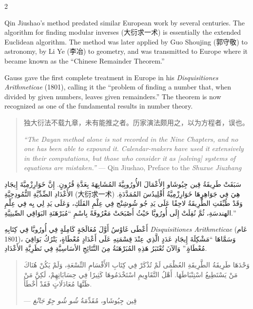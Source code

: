 \documentclass[11pt,a4paper]{article}
\newcommand{\ar}[1]{\arabicfont\beginR #1\endR}
\newcommand{\zhtext}[1]{{\chinese #1}}
\newenvironment{bilingual}{%
  \begin{paracol}{2}
}{%
  \end{paracol}
}
\begin{document}
\begin{bilingual}

\begin{leftcolumn*}
Qin Jiushao's method predated similar European work by several centuries. The algorithm for finding modular inverses (\zhtext{大衍求一术}) is essentially the extended Euclidean algorithm. The method was later applied by Guo Shoujing (\zhtext{郭守敬}) to astronomy, by Li Ye (\zhtext{李冶}) to geometry, and was transmitted to Europe where it became known as the ``Chinese Remainder Theorem.''

Gauss gave the first complete treatment in Europe in his \textit{Disquisitiones Arithmeticae} (1801), calling it the ``problem of finding a number that, when divided by given numbers, leaves given remainders.'' The theorem is now recognized as one of the fundamental results in number theory.

\begin{quote}
\zhtext{独大衍法不载九章，未有能推之者。历家演法颇用之，以为方程者，误也。}

\textit{``The Dayan method alone is not recorded in the Nine Chapters, and no one has been able to expound it. Calendar-makers have used it extensively in their computations, but those who consider it as [solving] systems of equations are mistaken.''} --- Qin Jiushao, Preface to the \textit{Shuxue Jiuzhang}
\end{quote}
\end{leftcolumn*}

\begin{rightcolumn*}
\ar{سَبَقَتْ طَرِيقَةُ قِين جِيُوشَاو الأَعْمَالَ الأُورُوبِيَّةَ المُشَابِهَةَ بِعَدَّةِ قُرُونٍ. إِنَّ خَوَارِزْمِيَّةَ إِيجَادِ الأَعْدَادِ الضِّدِّيَّةِ النُّمُودِجِيَّةِ (大衍求一术) هِيَ فِي جَوَاهِرِهَا خَوَارِزْمِيَّةُ أُقْلِيدُسَ المُمَدَّدَةِ. وَقَدْ طُبِّقَتِ الطَّرِيقَةُ لاحِقًا عَلَى يَدِ جُو شُوشِنْج فِي عِلْمِ الفَلَكِ، وَعَلَى يَدِ لِي يِه فِي عِلْمِ الهندسَةِ، ثُمَّ نُقِلَتْ إِلَى أُورُوبَّا حَيْثُ أَصْبَحَتْ مَعْرُوفَةً بِاسْمِ \enquote{مُبَرْهَنَةِ البَوَاقِي الصِّينِيَّةِ.}}

\ar{أَعْطَى غَاوْسُ أَوَّلَ مُعَالَجَةٍ كَامِلَةٍ فِي أُورُوبَّا فِي كِتَابِهِ \textit{Disquisitiones Arithmeticae} (عَام 1801)، وَسَمَّاهَا \enquote{مَشْكِلَةَ إِيجَادِ عَدَدٍ الَّذِي عِنْدَ قِسْمَتِهِ عَلَى أَعْدَادٍ مُعْطَاةٍ، يَتْرُكُ بَوَاقِيَ مُعْطَاةٍ.} وَالآنَ تُعْتَبَرُ هَذِهِ المُبَرْهَنَةُ مِنَ النَّتَائِجِ الأسَاسِيَّةِ فِي نَظَرِيَّةِ الأَعْدَادِ.}

\begin{quote}
\ar{وَحْدَهَا طَرِيقَةُ الطَّرِيقَةِ العُظْمَى لَمْ تُذْكَرْ فِي كِتَابِ الأَقْسَامِ التِّسْعَةِ، وَلَمْ يَكُنْ هُنَاكَ مَنْ يَسْتَطِيعُ اسْتِنْبَاطَهَا. أَهْلُ التَّقَاوِيمِ اسْتَخْدَمُوهَا كَثِيرًا فِي حِسَابَاتِهِمْ، لَكِنَّ مَنْ ظَنَّهَا مُعَادَلَاتٍ فَقَدْ أَخْطَأَ.}

\ar{--- قِين جِيُوشَاو، مُقَدِّمَةُ \textit{شُو شُو جِوْ جَانْغ}}
\end{quote}
\end{rightcolumn*}

\end{bilingual}
\end{document}
